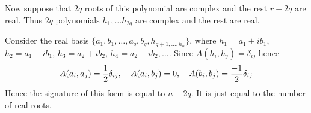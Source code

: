Now suppose that $2q$ roots of this polynomial are complex and the rest $r-2q$ are
real. Thus $2q$ polynomials $h_1,\dots h_{2q}$ are complex  and the rest are real.



Consider the real basis $\{a_1,b_1,\dots,a_q,b_q,h_{q+1,\dots,h_n}\}$, where
$h_1=a_1+ib_1$, $h_2=a_1-ib_1$, $h_3=a_2+ib_2$, $h_4=a_2-ib_2,\dots$. Since
$A(h_i,h_j)=\delta_{ij}$ hence
                     $$
   A(a_i,a_j)={1\over 2}\delta_{ij},\quad A(a_i,b_j)=0,\quad
   A(b_i,b_j)={-1\over 2}\delta_{ij}
                      $$
                      Hence the signature of this form
                      is equal to $n-2q$. It is just
                      equal to the number of real roots.

 \bye
